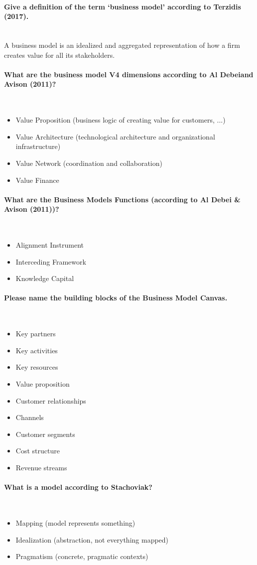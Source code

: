 \documentclass[10pt,a4paper,noendnumber=true]{scrartcl}
\newcommand{\properparagraph}[1]{\paragraph{\textcolor{Emerald}{#1}}\mbox{}\\}
\begin{document}
\properparagraph{Give a definition of the term ‘business model’ according to Terzidis (2017).}
A business model is an idealized and aggregated representation of how a firm creates value for all its stakeholders.


\properparagraph{What are the business model V4 dimensions according to Al Debeiand Avison (2011)?}
\begin{itemize}
	\item Value Proposition (business logic of creating value for customers, ...)
	\item Value Architecture (technological architecture and organizational infrastructure)
	\item Value Network (coordination and collaboration)
	\item Value Finance
\end{itemize}


\properparagraph{What are the Business Models Functions (according to Al Debei \& Avison (2011))?}
\begin{itemize}
	\item Alignment Instrument
	\item Interceding Framework
	\item Knowledge Capital
\end{itemize}


\properparagraph{Please name the building blocks of the Business Model Canvas.}
\begin{itemize}
	\item Key partners
	\item Key activities
	\item Key resources
	\item Value proposition
	\item Customer relationships
	\item Channels
	\item Customer segments
	\item Cost structure
	\item Revenue streams
\end{itemize}


\properparagraph{What is a model according to Stachoviak?}
\begin{itemize}
	\item Mapping (model represents something)
	\item Idealization (abstraction, not everything mapped)
	\item Pragmatism (concrete, pragmatic contexts)
\end{itemize}
\end{document}
